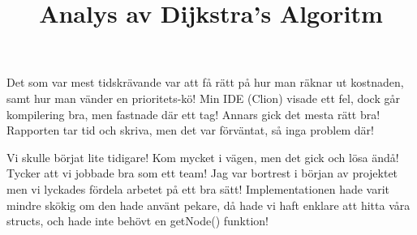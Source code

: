 \documentclass[fleqn,10pt]{article}
\begin{document}
\title{Analys av Dijkstra's Algoritm}

Det som var mest tidskrävande var att få rätt på hur man räknar ut kostnaden, samt hur man vänder en prioritets-kö!
Min IDE (Clion) visade ett fel, dock går kompilering bra, men fastnade där ett tag!
Annars gick det mesta rätt bra!
Rapporten tar tid och skriva, men det var förväntat, så inga problem där!

Vi skulle börjat lite tidigare!
Kom mycket i vägen, men det gick och lösa ändå!
Tycker att vi jobbade bra som ett team!
Jag var bortrest i början av projektet men vi lyckades fördela arbetet på ett bra sätt!
Implementationen hade varit mindre skökig om den hade använt pekare, då hade vi haft enklare att hitta våra structs, och hade inte behövt en getNode() funktion!
\end{document}
